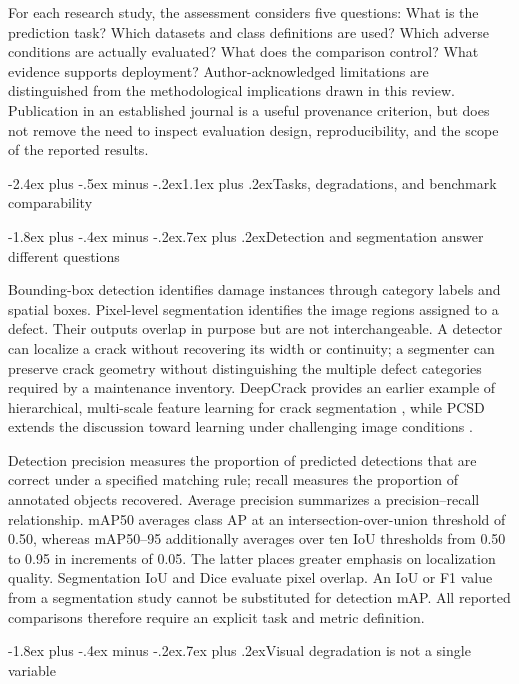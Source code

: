\documentclass[11pt,a4paper]{article}
\makeatletter
\renewcommand\section{\@startsection{section}{1}{\z@}%
  {-2.4ex plus -.5ex minus -.2ex}{1.1ex plus .2ex}{\normalfont\large\bfseries}}
\renewcommand\subsection{\@startsection{subsection}{2}{\z@}%
  {-1.8ex plus -.4ex minus -.2ex}{.7ex plus .2ex}{\normalfont\normalsize\bfseries}}
\makeatother
\begin{document}
For each research study, the assessment considers five questions: What is the prediction task? Which datasets and class definitions are used? Which adverse conditions are actually evaluated? What does the comparison control? What evidence supports deployment? Author-acknowledged limitations are distinguished from the methodological implications drawn in this review. Publication in an established journal is a useful provenance criterion, but does not remove the need to inspect evaluation design, reproducibility, and the scope of the reported results.

\section{Tasks, degradations, and benchmark comparability}

\subsection{Detection and segmentation answer different questions}

Bounding-box detection identifies damage instances through category labels and spatial boxes. Pixel-level segmentation identifies the image regions assigned to a defect. Their outputs overlap in purpose but are not interchangeable. A detector can localize a crack without recovering its width or continuity; a segmenter can preserve crack geometry without distinguishing the multiple defect categories required by a maintenance inventory. DeepCrack provides an earlier example of hierarchical, multi-scale feature learning for crack segmentation \cite{r8}, while PCSD extends the discussion toward learning under challenging image conditions \cite{r5}.

Detection precision measures the proportion of predicted detections that are correct under a specified matching rule; recall measures the proportion of annotated objects recovered. Average precision summarizes a precision--recall relationship. mAP50 averages class AP at an intersection-over-union threshold of 0.50, whereas mAP50--95 additionally averages over ten IoU thresholds from 0.50 to 0.95 in increments of 0.05. The latter places greater emphasis on localization quality. Segmentation IoU and Dice evaluate pixel overlap. An IoU or F1 value from a segmentation study cannot be substituted for detection mAP. All reported comparisons therefore require an explicit task and metric definition.

\subsection{Visual degradation is not a single variable}
\end{document}
